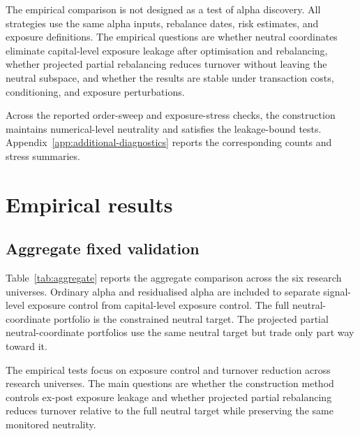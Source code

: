 \documentclass[11pt]{article}
\begin{document}
The empirical comparison is not designed as a test of alpha discovery. All strategies use the same alpha
inputs, rebalance dates, risk estimates, and exposure definitions. The empirical questions are whether
neutral coordinates eliminate capital-level exposure leakage after optimisation and rebalancing, whether
projected partial rebalancing reduces turnover without leaving the neutral subspace, and whether the
results are stable under transaction costs, conditioning, and exposure perturbations.

Across the reported order-sweep and exposure-stress checks, the construction maintains numerical-level
neutrality and satisfies the leakage-bound tests. Appendix~\ref{app:additional-diagnostics} reports the
corresponding counts and stress summaries.

\FloatBarrier
\section{Empirical results}

\subsection{Aggregate fixed validation}

Table~\ref{tab:aggregate} reports the aggregate comparison across the six research universes.  Ordinary
alpha and residualised alpha are included to separate signal-level exposure control from capital-level
exposure control.  The full neutral-coordinate portfolio is the constrained neutral target.
The projected partial neutral-coordinate portfolios use the same neutral target but trade only part way
toward it.

The empirical tests focus on exposure control and turnover reduction across research universes.  The
main questions are whether the construction method controls ex-post exposure leakage and whether
projected partial rebalancing reduces turnover relative to the full neutral target while preserving the same
monitored neutrality.
\end{document}
